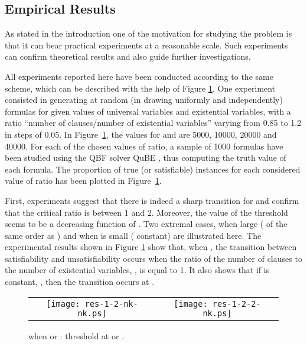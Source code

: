 \documentclass[aop,noinfoline]{imsart}
\begin{document}
\iffalse

\subsection{Empirical Results }\label{subsec:experiments}
As stated in the introduction one of the motivation for studying  the  problem is that it can bear practical experiments at a reasonable scale. Such experiments can confirm theoretical results and also guide further investigations.

All experiments reported here  have
been conducted according to the same scheme, which can be
described with the help of  Figure \ref{fig:threshold}. One
experiment consisted in generating at random (in drawing uniformly
and independently)  formulas for given values of 
universal variables and  existential variables, with a ratio
``number of clauses/number of existential variables'' varying from
0.85 to 1.2 in steps of 0.05. In Figure~\ref{fig:threshold}, the
values for  and  are 5000, 10000, 20000 and 40000. For each
of the chosen values of ratio, a sample of 1000 formulas have been
studied using the QBF solver QuBE \cite{Giunchiglia01a}, thus
computing the truth value of each formula. The proportion of true
(or satisfiable) instances for each considered value of ratio has
been plotted in Figure~\ref{fig:threshold}. 

First, experiments suggest that there is indeed a sharp transition for  and confirm  that the critical ratio is between
1 and 2. Moreover, the value of the threshold seems to be a decreasing function of . Two extremal cases, when  large (  of the same order as ) and  when  is small ( constant)  are illustrated here. 
The experimental results shown in Figure \ref{fig:threshold}
show  that, when , the transition between satisfiability
and unsatisfiability occurs when the ratio of the number of
clauses to the number of existential variables, , is equal to
1. It also  shows that if  is constant,
, then the transition occurs at .  



\begin{figure}[!h]
\begin{tabular}{cc}
\texttt{[image: res-1-2-nk-nk.ps]} 
& \texttt{[image: res-1-2-2-nk.ps]} \\
\end{tabular}
\caption{ when  or : threshold  at  or   .}
  \label{fig:threshold}
\end{figure}
\end{document}
